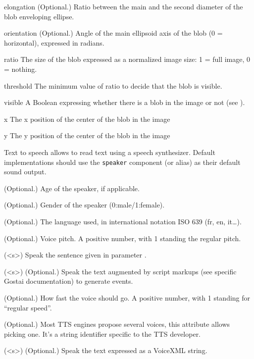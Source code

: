 \begin{urbiscriptapi}
\item[elongation]{} (Optional.)  Ratio between the main and the second
  diameter of the blob enveloping ellipse.


\item[orientation]{} (Optional.)  Angle of the main ellipsoid axis of the blob
  (0 = horizontal), expressed in radians.


\item[ratio] The size of the blob expressed as a normalized image size: 1 =
  full image, 0 = nothing.


\item[threshold] The minimum value of ratio to decide that the blob is
  visible.


\item[visible] A Boolean expressing whether there is a blob in the image or
  not (see ).


\item[x] The x position of the center of the blob in the image


\item[y] The y position of the center of the blob in the image
\end{urbiscriptapi}

Text to speech allows to read text using a speech synthesizer. Default
implementations should use the \lstinline{speaker} component (or alias) as
their default sound output.

\begin{urbiscriptapi}
\item[age]{} (Optional.) Age of the speaker, if applicable.


\item[gender]{} (Optional.) Gender of the speaker (0:male/1:female).


\item[lang]{} (Optional.) The language used, in international notation ISO 639
  (fr, en, it\ldots).


\item[pitch]{} (Optional.) Voice pitch.  A positive number, with 1 standing
  the regular pitch.


\item[say](<s>) Speak the sentence given in parameter .


\item[script](<s>) (Optional.) Speak the text  augmented by script
  markups (see specific Gostai documentation) to generate \urbi events.


\item[speed]{} (Optional.) How fast the voice should go.  A positive number,
  with 1 standing for ``regular speed''.


\item[voice]{} (Optional.) Most TTS engines propose several voices, this
  attribute allows picking one. It's a string identifier specific to the TTS
  developer.


\item[voicexml](<s>) (Optional.) Speak the text  expressed as a
  VoiceXML string.
\end{urbiscriptapi}


